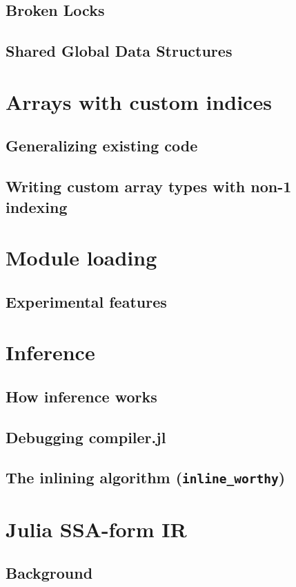     \subsection{Broken Locks}
    \subsection{Shared Global Data Structures}
    \section{Arrays with custom indices}
    \subsection{Generalizing existing code}
    \subsection{Writing custom array types with non-1 indexing}
    \section{Module loading}
    \subsection{Experimental features}
    \section{Inference}
    \subsection{How inference works}
    \subsection{Debugging compiler.jl}
    \subsection{The inlining algorithm (\texttt{inline\_worthy})}
    \section{Julia SSA-form IR}
    \subsection{Background}
